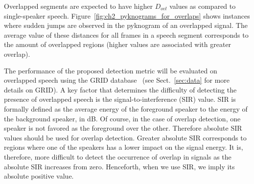 {Overlapped segments are expected to have higher $D_{ovl}$ values as compared to single-speaker speech. 
Figure~\ref{fig:ch2_pyknograms_for_overlaps} shows instances where sudden jumps are observed in the pyknogram of an overlapped signal. 
The average value of these distances for all frames in a speech segment corresponds to the amount of overlapped regions (higher values are associated with greater overlap). 

The performance of the proposed detection metric will be evaluated on overlapped speech using the GRID database~\cite{SSC_link} (see Sect.~\ref{sec:data} for more details on GRID). 
A key factor that determines the difficulty of detecting the presence of overlapped speech is the signal-to-interference (SIR) value. 
SIR is formally defined as the average energy of the foreground speaker to the energy of the background speaker, in dB. 
Of course, in the case of overlap detection, one speaker is not favored as the foreground over the other. 
Therefore absolute SIR values should be used for overlap detection. 
Greater absolute SIR corresponds to regions where one of the speakers has a lower impact on the signal energy. 
It is, therefore, more difficult to detect the occurrence of overlap in signals as the absolute SIR increases from zero.  
Henceforth, when we use SIR, we imply its absolute positive value. 

}
